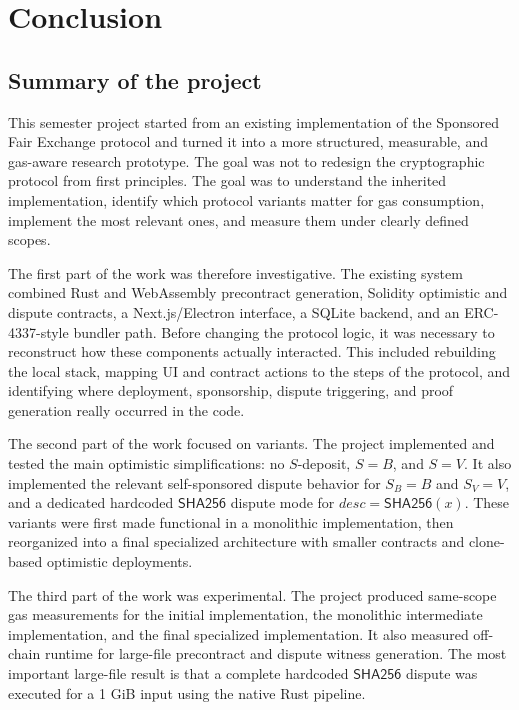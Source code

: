 \chapter{Conclusion}
\label{chap:conclusion}

\section{Summary of the project}

This semester project started from an existing implementation of the Sponsored Fair
Exchange protocol and turned it into a more structured, measurable, and gas-aware research
prototype. The goal was not to redesign the cryptographic protocol from first principles.
The goal was to understand the inherited implementation, identify which protocol variants
matter for gas consumption, implement the most relevant ones, and measure them under
clearly defined scopes.

The first part of the work was therefore investigative. The existing system combined Rust
and WebAssembly precontract generation, Solidity optimistic and dispute contracts, a
Next.js/Electron interface, a SQLite backend, and an ERC-4337-style bundler path. Before
changing the protocol logic, it was necessary to reconstruct how these components actually
interacted. This included rebuilding the local stack, mapping UI and contract actions to
the steps of the protocol, and identifying where deployment, sponsorship, dispute
triggering, and proof generation really occurred in the code.

The second part of the work focused on variants. The project implemented and tested the
main optimistic simplifications: no \(S\)-deposit, \(S=B\), and \(S=V\). It also implemented
the relevant self-sponsored dispute behavior for \(S_B=B\) and \(S_V=V\), and a dedicated
hardcoded \(\mathsf{SHA256}\) dispute mode for \(desc=\mathsf{SHA256}(x)\). These variants
were first made functional in a monolithic implementation, then reorganized into a final
specialized architecture with smaller contracts and clone-based optimistic deployments.

The third part of the work was experimental. The project produced same-scope gas
measurements for the initial implementation, the monolithic intermediate implementation,
and the final specialized implementation. It also measured off-chain runtime for large-file
precontract and dispute witness generation. The most important large-file result is that a
complete hardcoded \(\mathsf{SHA256}\) dispute was executed for a 1 GiB input using the
native Rust pipeline.

